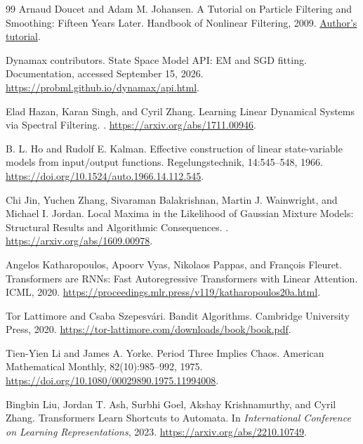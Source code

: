 \documentclass[11pt,twoside]{article}
\theoremstyle{definition}
\theoremstyle{remark}
\begin{document}
\begin{thebibliography}{99}
Arnaud Doucet and Adam M. Johansen.
\newblock A Tutorial on Particle Filtering and Smoothing: Fifteen Years Later.
\newblock Handbook of Nonlinear Filtering, 2009.
\newblock \href{https://www.stats.ox.ac.uk/~doucet/doucet_johansen_tutorialPF.pdf}{Author's tutorial}.

Dynamax contributors.
\newblock State Space Model API: EM and SGD fitting.
\newblock Documentation, accessed September 15, 2026.
\newblock \url{https://probml.github.io/dynamax/api.html}.

Elad Hazan, Karan Singh, and Cyril Zhang.
\newblock Learning Linear Dynamical Systems via Spectral Filtering.
. \url{https://arxiv.org/abs/1711.00946}.

B. L. Ho and Rudolf E. Kalman.
\newblock Effective construction of linear state-variable models
from input/output functions.
\newblock Regelungstechnik, 14:545--548, 1966.
\newblock \url{https://doi.org/10.1524/auto.1966.14.112.545}.

Chi Jin, Yuchen Zhang, Sivaraman Balakrishnan, Martin J. Wainwright,
and Michael I. Jordan.
\newblock Local Maxima in the Likelihood of Gaussian Mixture Models:
Structural Results and Algorithmic Consequences.
. \url{https://arxiv.org/abs/1609.00978}.

Angelos Katharopoulos, Apoorv Vyas, Nikolaos Pappas, and Fran\c{c}ois Fleuret.
\newblock Transformers are RNNs: Fast Autoregressive Transformers with Linear Attention.
\newblock ICML, 2020.
\newblock \url{https://proceedings.mlr.press/v119/katharopoulos20a.html}.

Tor Lattimore and Csaba Szepesv\'ari.
\newblock Bandit Algorithms.
\newblock Cambridge University Press, 2020.
\newblock \url{https://tor-lattimore.com/downloads/book/book.pdf}.

Tien-Yien Li and James A. Yorke.
\newblock Period Three Implies Chaos.
\newblock American Mathematical Monthly, 82(10):985--992, 1975.
\newblock \url{https://doi.org/10.1080/00029890.1975.11994008}.

Bingbin Liu, Jordan T. Ash, Surbhi Goel, Akshay Krishnamurthy, and Cyril Zhang.
\newblock Transformers Learn Shortcuts to Automata.
\newblock In \emph{International Conference on Learning Representations}, 2023.
\newblock \url{https://arxiv.org/abs/2210.10749}.


\end{thebibliography}
\end{document}
